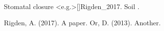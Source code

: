 \documentclass{article}
\let\cite\shortcite
\begin{document}
Stomatal closure \cite<e.g.>[]{Rigden_2017}. Soil .
\begin{thebibliography}{}
 Rigden, A. (2017). A paper.
 Or, D. (2013). Another.
\end{thebibliography}
\end{document}
